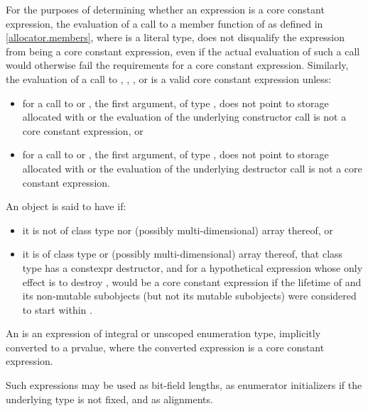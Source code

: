 \pnum
For the purposes of determining
whether an expression is a core constant expression,
the evaluation of a call to a member function of 
as defined in \ref{allocator.members}, where  is a literal type,
does not disqualify the expression from being a core constant expression,
even if the actual evaluation of such a call
would otherwise fail the requirements for a core constant expression.
Similarly, the evaluation of a call to
,
,
, or
is a valid core constant expression unless:
\begin{itemize}
\item
  for a call to  or ,
  the first argument, of type ,
  does not point to storage allocated with  or
  the evaluation of the underlying constructor call
  is not a core constant expression, or
\item
  for a call to  or ,
  the first argument, of type ,
  does not point to storage allocated with  or
  the evaluation of the underlying destructor call
  is not a core constant expression.
\end{itemize}

\pnum
An object  is said to have  if:
\begin{itemize}
\item
  it is not of class type nor (possibly multi-dimensional) array thereof, or
\item
  it is of class type or (possibly multi-dimensional) array thereof,
  that class type has a constexpr destructor, and
  for a hypothetical expression 
  whose only effect is to destroy ,
   would be a core constant expression
  if the lifetime of  and its non-mutable subobjects
  (but not its mutable subobjects) were considered to start within .
\end{itemize}

\pnum
An 
is an expression of integral or
unscoped enumeration type, implicitly converted to a prvalue, where the converted expression is a core constant expression.
\begin{note}
Such expressions may be
used as bit-field lengths, as enumerator
initializers if the underlying type is not fixed,
and as alignments.
\end{note}

